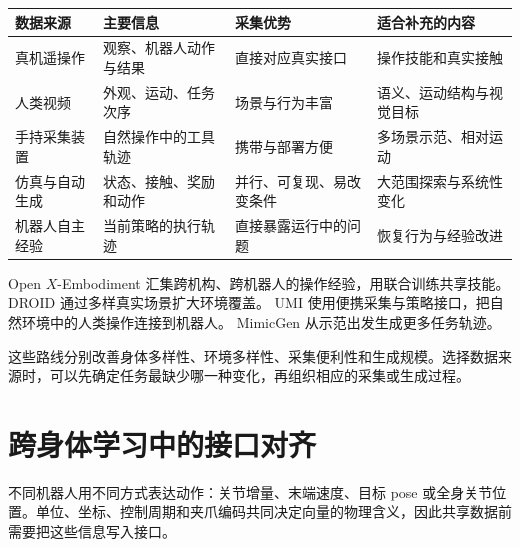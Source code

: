 \documentclass[UTF8,a4paper,11pt,oneside,openany,fontset=none]{ctexbook}
\begin{document}
{\small %
\begin{longtable}[]{@{}
  >{\raggedright\arraybackslash}p{}
  >{\raggedright\arraybackslash}p{}
  >{\raggedright\arraybackslash}p{}
  >{\raggedright\arraybackslash}p{}@{}}
\toprule\noalign{}
\begin{minipage}[b]{\linewidth}\raggedright
数据来源
\end{minipage} & \begin{minipage}[b]{\linewidth}\raggedright
主要信息
\end{minipage} & \begin{minipage}[b]{\linewidth}\raggedright
采集优势
\end{minipage} & \begin{minipage}[b]{\linewidth}\raggedright
适合补充的内容
\end{minipage} \\
\midrule\noalign{}
\endhead
\bottomrule\noalign{}
\endlastfoot
真机遥操作 & 观察、机器人动作与结果 & 直接对应真实接口 & 操作技能和真实接触 \\
人类视频 & 外观、运动、任务次序 & 场景与行为丰富 & 语义、运动结构与视觉目标 \\
手持采集装置 & 自然操作中的工具轨迹 & 携带与部署方便 & 多场景示范、相对运动 \\
仿真与自动生成 & 状态、接触、奖励和动作 & 并行、可复现、易改变条件 & 大范围探索与系统性变化 \\
机器人自主经验 & 当前策略的执行轨迹 & 直接暴露运行中的问题 & 恢复行为与经验改进 \\
\end{longtable}
}

Open \(X\)-Embodiment 汇集跨机构、跨机器人的操作经验，用联合训练共享技能。\cite{R35} DROID 通过多样真实场景扩大环境覆盖。\cite{R36} UMI 使用便携采集与策略接口，把自然环境中的人类操作连接到机器人。\cite{R37} MimicGen 从示范出发生成更多任务轨迹。\cite{R38}

这些路线分别改善身体多样性、环境多样性、采集便利性和生成规模。选择数据来源时，可以先确定任务最缺少哪一种变化，再组织相应的采集或生成过程。

\section{跨身体学习中的接口对齐}

不同机器人用不同方式表达动作：关节增量、末端速度、目标 pose 或全身关节位置。单位、坐标、控制周期和夹爪编码共同决定向量的物理含义，因此共享数据前需要把这些信息写入接口。
\end{document}

